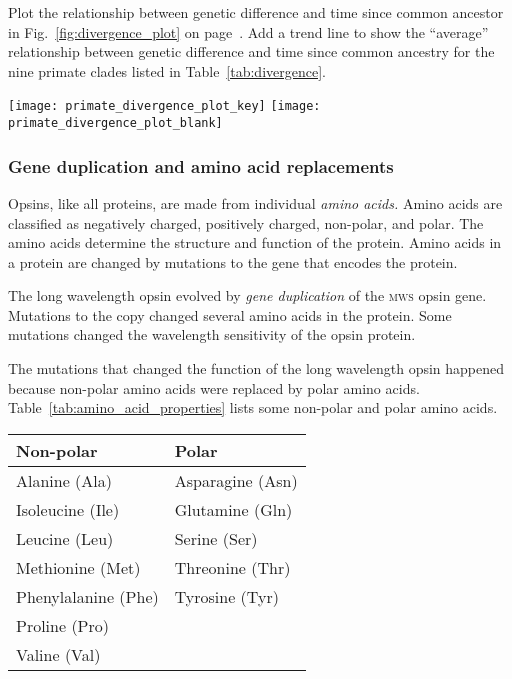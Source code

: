 \documentclass[12pt, addpoints]{exam}
\newcommand{\mws}{\textsc{mws}}
\begin{document}
\begin{questions}
\bigskip

\question[2]
Plot the relationship between genetic difference and time since common ancestor in Fig.~\ref{fig:divergence_plot} on page~\pageref{tab:divergence}. Add a trend line to show the “average” relationship between genetic difference and time since common ancestry for the nine primate clades listed in Table~\ref{tab:divergence}.

\parbox{\linewidth}{%
\ifprintanswers
\texttt{[image: primate\_divergence\_plot\_key]}
\else
\texttt{[image: primate\_divergence\_plot\_blank]}
\fi
{}\label{fig:divergence_plot}\par
}

\subsubsection*{Gene duplication and amino acid replacements}

Opsins, like all proteins, are made from individual \textit{amino acids.} Amino acids are classified as negatively charged, positively charged, non-polar, and polar. The amino acids determine the structure and function of the protein. Amino acids in a protein are changed by mutations to the gene that encodes the protein. 

\begin{minipage}[t]{0.48\linewidth}
The long wavelength opsin evolved by \textit{gene duplication} of the \mws{} opsin gene. Mutations to the copy changed several amino acids in the protein. Some mutations changed the wavelength sensitivity of the opsin protein.

\bigskip

The mutations that changed the function of the long wavelength opsin happened because non-polar amino acids were replaced by polar amino acids. Table~\ref{tab:amino_acid_properties} lists some non-polar and polar amino acids. 
\end{minipage}%
\hfill
\begin{minipage}[t]{0.48\linewidth}\vspace{-10pt}%
\begin{threeparttable}[t]
\captionsetup{type=table, position=top,skip=0pt}
\label{tab:amino_acid_properties}
\begin{tabular}{@{}ll@{}}
\toprule
Non-polar 			& Polar \tabularnewline
\midrule
Alanine (Ala) 		& Asparagine (Asn)	\tabularnewline
Isoleucine (Ile)	& Glutamine	(Gln)	\tabularnewline
Leucine	(Leu)		& Serine (Ser)		\tabularnewline
Methionine (Met)	& Threonine (Thr)	\tabularnewline
Phenylalanine (Phe)	& Tyrosine (Tyr)	\tabularnewline
Proline	(Pro)		&					\tabularnewline
Valine (Val)		&					\tabularnewline
\bottomrule
\end{tabular}\par
\end{threeparttable}\par
\end{minipage}


\end{questions}
\end{document}

